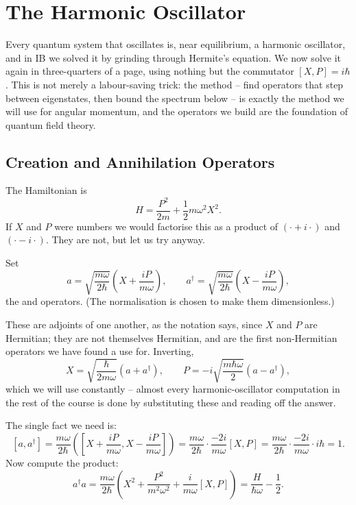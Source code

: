 \documentclass[a4paper]{scrartcl}
\begin{document}
\section{The Harmonic Oscillator}

Every quantum system that oscillates is, near equilibrium, a harmonic oscillator, and in IB we solved it by grinding through Hermite's equation. We now solve it again in three-quarters of a page, using nothing but the commutator $[X,P] = i\hbar$. This is not merely a labour-saving trick: the method -- find operators that step between eigenstates, then bound the spectrum below -- is exactly the method we will use for angular momentum, and the operators we build are the foundation of quantum field theory.

\subsection{Creation and Annihilation Operators}

The Hamiltonian is
$$
H = \frac{P^2}{2m} + \frac{1}{2}m\omega^2 X^2.
$$
If $X$ and $P$ were numbers we would factorise this as a product of $(\cdot + i \cdot)$ and $(\cdot - i\cdot)$. They are not, but let us try anyway.

\begin{definition}
    Set
    $$
    a = \sqrt{\frac{m\omega}{2\hbar}}\left( X + \frac{i P}{m\omega} \right), \qquad
    a^\dagger = \sqrt{\frac{m\omega}{2\hbar}}\left( X - \frac{i P}{m\omega} \right),
    $$
    the  and  operators. (The normalisation is chosen to make them dimensionless.)
\end{definition}

These are adjoints of one another, as the notation says, since $X$ and $P$ are Hermitian; they are not themselves Hermitian, and are the first non-Hermitian operators we have found a use for. Inverting,
$$
X = \sqrt{\frac{\hbar}{2m\omega}}\left(a + a^\dagger\right), \qquad P = -i\sqrt{\frac{m\hbar\omega}{2}}\left(a - a^\dagger\right),
$$
which we will use constantly -- almost every harmonic-oscillator computation in the rest of the course is done by substituting these and reading off the answer.

The single fact we need is:
$$
[a, a^\dagger] = \frac{m\omega}{2\hbar}\left( \left[X + \frac{iP}{m\omega}, X - \frac{iP}{m\omega}\right] \right) = \frac{m\omega}{2\hbar}\cdot\frac{-2i}{m\omega}[X,P] = \frac{m\omega}{2\hbar}\cdot\frac{-2i}{m\omega}\cdot i\hbar = 1.
$$
Now compute the product:
$$
a^\dagger a = \frac{m\omega}{2\hbar}\left( X^2 + \frac{P^2}{m^2\omega^2} + \frac{i}{m\omega}[X, P] \right) = \frac{H}{\hbar\omega} - \frac{1}{2}.
$$
\end{document}
